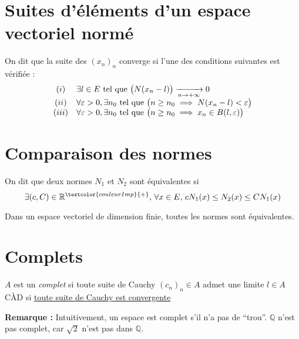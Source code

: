 \documentclass[11pt,a4paper,fleqn,pdftex]{report}
\begin{document}
\section{Suites d'éléments d'un espace vectoriel normé} %
\label{sec:suites_evn}
\begin{dfn}
    On dit que la suite des $(x_n)_n $ converge si l'une des conditions suivantes est vérifiée : 
    \begin{equation}
    \begin{array}{c l }
    (i) & \exists l \in E \text{ tel que } \big(N(x_n - l) \big) \xrightarrow[n\to +\infty]{} 0 \\
    (ii) & \forall \varepsilon > 0, \exists n_0 \text{ tel que } \big( n \geq n_0 \implies N(x_n - l) < \varepsilon \big) \\
    (iii) & \forall \varepsilon > 0, \exists n_0 \text{ tel que } \big( n \geq n_0 \implies x_n \in B(l,\varepsilon) \big)
    \end{array}
    \end{equation}
\end{dfn}
\section{Comparaison des normes} %
\label{sec:comparaison_des_normes}
\begin{dfn}
     On dit que deux normes $N_1$ et $N_2$ sont équivalentes si
     \begin{equation}
     \exists (c,C)\in \mathbb{R}^{\textcolor{couleurImp}{+}},\, \forall x \in E,\, cN_1(x) \le N_2(x) \le CN_1(x)
     \end{equation}
     
\end{dfn}
\begin{itheorem}
     Dans un espace vectoriel de dimension finie, toutes les normes sont équivalentes.
\end{itheorem}
\section{Complets} %
\label{sec:complets}
\begin{dfn}[Complet]
$A$ est un \emph{complet} si toute suite de Cauchy $(c_n)_n \in A$ admet une limite $l\in A$\\
CÀD si \uline{toute suite de Cauchy est convergente}
\end{dfn}
\textbf{Remarque :} Intuitivement, un espace est complet s'il n'a pas de \enquote{trou}. $\mathbb{Q}$ n'est pas complet, car $\sqrt{2}$ n'est pas dans $\mathbb{Q}$.
\end{document}
